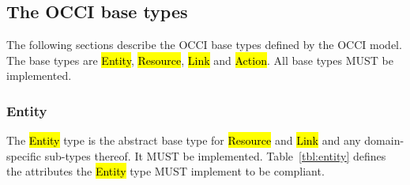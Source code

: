 \documentclass[10pt,a4paper,british]{article}
\begin{document}

\subsection{The OCCI base types}
\label{sec:base_types}
The following sections describe the OCCI base types defined by the OCCI model.
The base types are \hl{Entity}, \hl{Resource}, \hl{Link} and \hl{Action}. All
base types MUST be implemented.

\subsubsection{Entity}
\label{sec:entity}
The \hl{Entity} type is the abstract base type for \hl{Resource} and \hl{Link}
and any domain-specific sub-types thereof. It MUST be implemented.
%
Table~\ref{tbl:entity} defines the attributes the \hl{Entity} type MUST implement to
be compliant.
\end{document}
